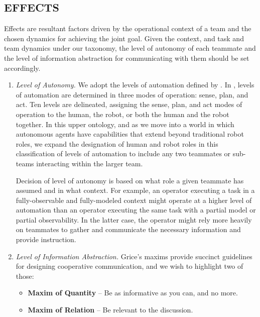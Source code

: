 \documentclass[letterpaper, 10 pt, conference]{ieeeconf}  %
\theoremstyle{definition}
\begin{document}
\subsection{EFFECTS}
Effects are resultant factors driven by the operational context of a team and the chosen dynamics for achieving the joint goal.
Given the  context, and task and team dynamics under our taxonomy, the level of autonomy of each teammate and the level of information abstraction for communicating with them should be set accordingly. 
\begin{enumerate}
    \item \textit{Level of Autonomy.}
    We adopt the levels of automation defined by \citeauthor{Beer2014toward} \cite{Beer2014toward}. In \cite{Beer2014toward}, levels of automation are determined in three modes of operation: sense, plan, and act. Ten levels are delineated, assigning the sense, plan, and act modes of operation to the human, the robot, or both the human and the robot together. In this upper ontology, and as we move into a world in which autonomous agents have capabilities that extend beyond traditional robot roles, we expand the designation of human and robot roles in this classification of levels of automation to include any two teammates or sub-teams interacting within the larger team.
    
    Decision of level of autonomy is based on what role a given teammate has assumed and in what context. For example, an operator executing a task in a fully-observable and fully-modeled context might operate at a higher level of automation than an operator executing the same task with a partial model or partial observability. In the latter case, the operator might rely more heavily on teammates to gather and communicate the necessary information and provide instruction. 
    
    
    
    \item \textit{Level of Information Abstraction.}
    Grice's maxims \cite{grice1975logic} provide succinct guidelines for designing cooperative communication, and we wish to highlight two of those:
    \begin{itemize}
        \item \textbf{Maxim of Quantity} -- Be as informative as you can, and no more.
        \item \textbf{Maxim of Relation} -- Be relevant to the discussion.
    \end{itemize}
    

\end{enumerate}
\end{document}
